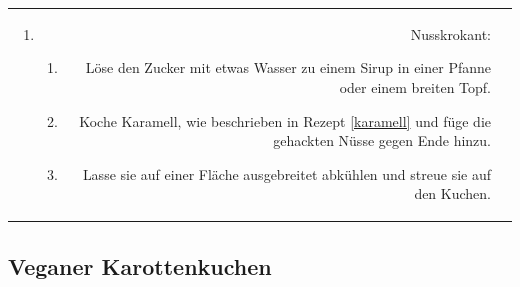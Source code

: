 \documentclass[a4paper, 12pt]{scrbook} 								%
\numberwithin{equation}{section} 									%
\begin{document}
\begin{tabularx}{\textwidth}{r|L}
\begin{enumerate}[]
											\item Nusskrokant:
											\begin{enumerate}
												\item Löse den Zucker mit etwas Wasser zu einem Sirup in einer Pfanne oder einem breiten Topf.
												\item Koche Karamell, wie beschrieben in Rezept \ref{karamell} und füge die gehackten Nüsse gegen Ende hinzu.
												\item Lasse sie auf einer Fläche ausgebreitet abkühlen und streue sie auf den Kuchen.
											\end{enumerate}
										\end{enumerate}	\\
		\end{tabularx}
		\newpage

		\subsection{Veganer Karottenkuchen}	\label{Karottenkuchen}
\end{document}
